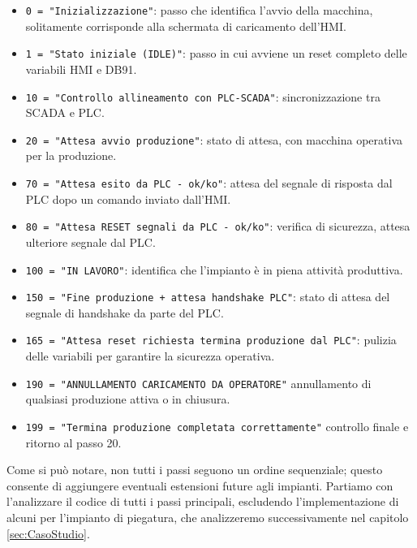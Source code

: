 \begin{itemize}
    \item \verb|0 = "Inizializzazione"|: passo che identifica l'avvio della macchina, solitamente corrisponde alla schermata di caricamento dell'HMI.
    \item \verb|1 = "Stato iniziale (IDLE)"|: passo in cui avviene un reset completo delle variabili HMI e DB91.
    \item \verb|10 = "Controllo allineamento con PLC-SCADA"|: sincronizzazione tra SCADA e PLC.
    \item \verb|20 = "Attesa avvio produzione"|: stato di attesa, con macchina operativa per la produzione.
    \item \verb|70 = "Attesa esito da PLC - ok/ko"|: attesa del segnale di risposta dal PLC dopo un comando inviato dall'HMI.
    \item \verb|80 = "Attesa RESET segnali da PLC - ok/ko"|: verifica di sicurezza, attesa ulteriore segnale dal PLC.
    \item \verb|100 = "IN LAVORO"|: identifica che l'impianto è in piena attività produttiva.
    \item \verb|150 = "Fine produzione + attesa handshake PLC"|: stato di attesa del segnale di handshake da parte del PLC.
    \item \verb|165 = "Attesa reset richiesta termina produzione dal PLC"|: pulizia delle variabili per garantire la sicurezza operativa.
    \item \verb|190 = "ANNULLAMENTO CARICAMENTO DA OPERATORE"| annullamento di qualsiasi produzione attiva o in chiusura.
    \item \verb|199 = "Termina produzione completata correttamente"| controllo finale e ritorno al passo 20.
\end{itemize}
Come si può notare, non tutti i passi seguono un ordine sequenziale; questo consente di aggiungere eventuali estensioni future agli impianti. Partiamo con l'analizzare il codice di tutti i passi principali, escludendo l'implementazione di alcuni per l'impianto di piegatura, che analizzeremo successivamente nel capitolo \ref{sec:CasoStudio}.

